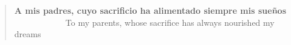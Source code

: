 \documentclass[12pt,hidelinks,openright,a4paper,english]{book}
\makeatletter
\newenvironment{dedication}
    {\vspace{6ex}\begin{quotation}\begin{center}\begin{em}}
    {\par\end{em}\end{center}\end{quotation}}
\renewcommand{\cleardoublepage}{
\clearpage\ifodd\c@page\else
\hbox{}
\vspace*{\fill}
\thispagestyle{empty}
\newpage
\fi}
\makeatother
\begin{document}
\pagestyle{empty}

\thispagestyle{empty}

~\\ \newpage



~\\
\newpage
\vspace*{3cm}
\pagestyle{empty}
\begin{dedication}
\scriptsize
\begin{changemargin}{5cm}{-8cm} 
\hspace{0cm} \textbf{A mis padres, cuyo sacrificio ha alimentado siempre mis sueños}\\
\hspace{0cm} ~~~~~~~~~~~~To my parents, whose sacrifice has always nourished my dreams\\
\end{changemargin}
\textsc{}
\end{dedication}
\textsc{}
\cleardoublepage
%


\frontmatter
\pagestyle{fancy}
\setlength{\parskip}{1ex}






\listoffigures



\tableofcontents




\end{document}

